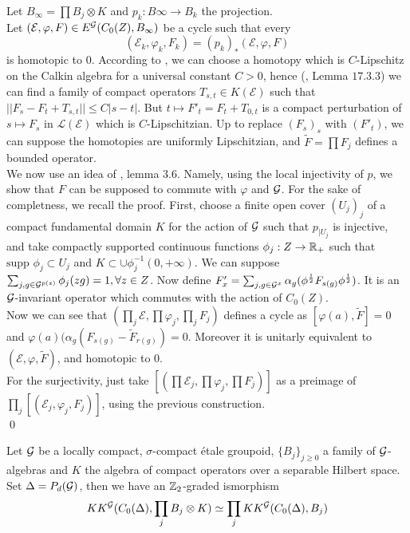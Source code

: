 \begin{dem}
Let $B_\infty = \prod B_j\otimes K$ and $p_k : B\infty \rightarrow B_k$ the projection.\\
Let $(\mathcal E ,\varphi,F)\in E^\mathcal G(C_0(Z), B_\infty)$ be a cycle such that every 
\[(\mathcal E_k , \varphi_k,F_k)=(p_k)_*(\mathcal E ,\varphi,F)\] 
is homotopic to $0$. 
According to \cite{OY3}, we can choose a homotopy which is $C$-Lipschitz on the Calkin algebra for a universal constant $C>0$, hence (\cite{WeggeOlsen}, Lemma $17.3.3$) we can find a family of compact operators $T_{s,t}\in K(\mathcal E)$ such that $||F_s-F_t+T_{s,t}||\leq C|s-t|$. But $t\mapsto F'_t= F_{t}+T_{0,t}$ is a compact perturbation of $s\mapsto F_s$ in $\mathcal L(\mathcal E)$ which is $C$-Lipschitzian. Up to replace $(F_s)_s$ with $(F'_t)$, we can suppose the homotopies are uniformly Lipschitzian, and $\tilde F=\prod F_j$ defines a bounded operator.\\
We now use an idea of \cite{TuBC2}, lemma $3.6$. Namely, using the local injectivity of $p$, we show that $F$ can be supposed to commute with $\varphi$ and $\mathcal G$. For the sake of completness, we recall the proof. First, choose a finite open cover $(U_j)_j$ of a compact fundamental domain $K$ for the action of $\mathcal G$ such that $p_{|U_j}$ is injective, and take compactly supported continuous functions $\phi_j : Z\rightarrow \mathbb R_+$ such that $\text{supp }\phi_j \subset U_j$ and $K\subset \cup \phi_j^{-1}(0,+\infty)$. We can suppose $\sum_{j,g\in \mathcal G^{p(z)}} \phi_j (zg) = 1,\forall z\in Z$. Now define $F'_x = \sum_{j, g\in \mathcal G^x} \alpha_g (\phi^{\frac{1}{2}} F_{s(g)}\phi^{\frac{1}{2}})$. It is an $\mathcal G$-invariant operator which commutes with the action of $C_0(Z)$.\\
Now we can see that $(\prod_j \mathcal E , \prod \varphi_j , \prod_j F_j)$ defines a cycle as $[\varphi(a),\tilde F]=0$ and $\varphi(a)(\alpha_g(F_{s(g)}-\tilde F_{r(g)})=0$. Moreover it is unitarly equivalent to $(\mathcal E,\varphi, \tilde F )$, and homotopic to $0$.\\
For the surjectivity, just take $[(\prod \mathcal E_j,\prod \varphi_j,\prod F_j)]$ as a preimage of $\prod_j [(\mathcal E_j, \varphi_j,F_j)]$, using the previous construction.\\
\qed  
\end{dem}

\begin{lem}\label{prod}
Let $\mathcal G$ be a locally compact, $\sigma$-compact étale groupoid, $\{B_j\}_{j\geq 0}$ a family of $\mathcal G$-algebras and $K$ the algebra of compact operators over a separable Hilbert space. Set $\Delta=P_d(\mathcal G)$, then we have an $\mathbb Z_2$-graded ismorphism 
\[KK^\mathcal G(C_0(\Delta),\prod_j B_j\otimes K)\simeq \prod_j KK^\mathcal G(C_0(\Delta),B_j)\]
\end{lem}

